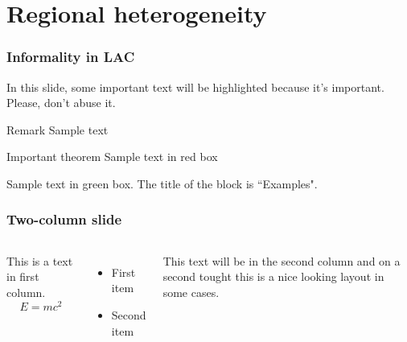 \documentclass{beamer}
\begin{document}
\section{Regional heterogeneity}

\begin{frame}
\frametitle{Informality in LAC}

In this slide, some important text will be
\alert{highlighted} because it's important.
Please, don't abuse it.

\begin{block}{Remark}
Sample text
\end{block}

\begin{alertblock}{Important theorem}
Sample text in red box
\end{alertblock}

\begin{examples}
Sample text in green box. The title of the block is ``Examples".
\end{examples}
\end{frame}


\begin{frame}
\frametitle{Two-column slide}

\begin{columns}

This is a text in first column.
$$E=mc^2$$
\begin{itemize}
\item First item
\item Second item
\end{itemize}

This text will be in the second column
and on a second tought this is a nice looking
layout in some cases.
\end{columns}
\end{frame}
\end{document}
